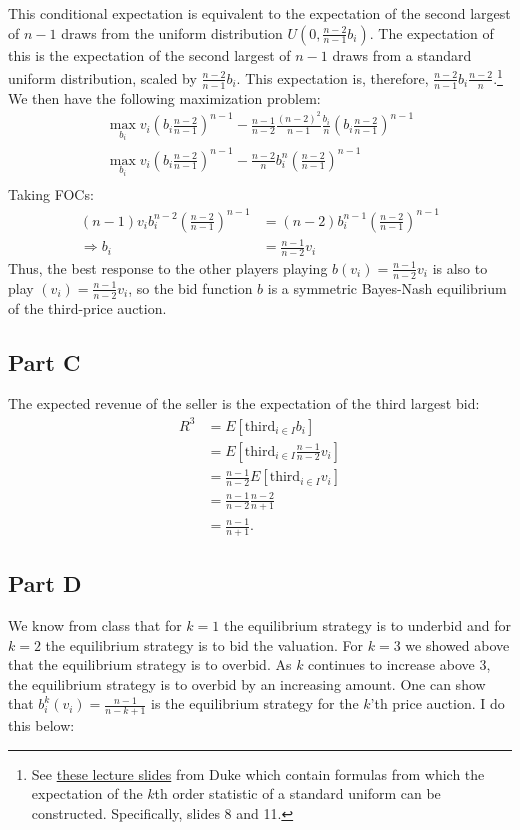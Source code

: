 \documentclass[11pt]{article} %
\begin{document}
This conditional expectation is equivalent to the expectation of the second largest of $n-1$ draws from the uniform distribution $U\left(0,\frac{n-2}{n-1}b_i\right)$. The expectation of this is the expectation of the second largest of $n-1$ draws from a standard uniform distribution, scaled by $\frac{n-2}{n-1}b_i$. This expectation is, therefore, $\frac{n-2}{n-1}b_i \frac{n-2}{n}$.\footnote{See \href{https://www2.stat.duke.edu/courses/Spring12/sta104.1/Lectures/Lec15.pdf}{these lecture slides} from Duke which contain formulas from which the expectation of the $k$th order statistic of a standard uniform can be constructed. Specifically, slides 8 and 11.} We then have the following maximization problem:
\begin{align*}
\max_{b_i} v_i \left(b_i\frac{n-2}{n-1}\right)^{n-1} - \frac{n-1}{n-2} \frac{(n-2)^2}{n-1} \frac{b_i}{n} \left(b_i\frac{n-2}{n-1}\right)^{n-1}\\
\max_{b_i} v_i \left(b_i\frac{n-2}{n-1}\right)^{n-1} -   \frac{n-2}{n} b_i^n\left(\frac{n-2}{n-1}\right)^{n-1}\\
\end{align*}
Taking FOCs:
\begin{align*}
(n-1)v_ib_i^{n-2}\left(\frac{n-2}{n-1}\right)^{n-1} &= (n-2)b_i^{n-1}\left(\frac{n-2}{n-1} \right)^{n-1}\\
\Rightarrow b_i &= \frac{n-1}{n-2}v_i
\end{align*}
Thus, the best response to the other players playing $b(v_i) = \frac{n-1}{n-2}v_i$ is also to play $(v_i) = \frac{n-1}{n-2}v_i$, so the bid function $b$ is a symmetric Bayes-Nash equilibrium of the third-price auction.

\subsection{Part C}
The expected revenue of the seller is the expectation of the third largest bid:
\begin{align*}
R^3 &= E[\text{third}_{i\in I} b_i]\\
&= E[\text{third}_{i\in I}  \frac{n-1}{n-2}v_i]\\
&=  \frac{n-1}{n-2}E[\text{third}_{i\in I}  v_i]\\
&=  \frac{n-1}{n-2}\frac{n-2}{n+1}\\
&= \frac{n-1}{n+1}.
\end{align*}
\subsection{Part D}
We know from class that for $k =1$ the equilibrium strategy is to underbid and for $k=2$ the equilibrium strategy is to bid the valuation. For $k=3$ we showed above that the equilibrium strategy is to overbid. As $k$ continues to increase above $3$, the equilibrium strategy is to overbid by an increasing amount. One can show that $b^k_i(v_i) = \frac{n-1}{n-k+1}$ is the equilibrium strategy for the $k$'th price auction. I do this below:
\end{document}
